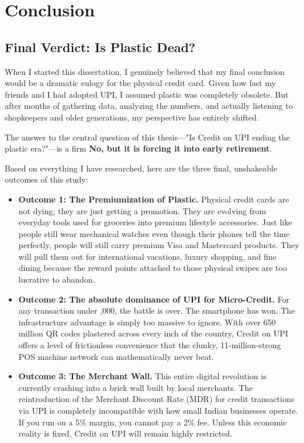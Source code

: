 \chapter{Conclusion}

\section{Final Verdict: Is Plastic Dead?}

When I started this dissertation, I genuinely believed that my final conclusion would be a dramatic eulogy for the physical credit card. Given how fast my friends and I had adopted UPI, I assumed plastic was completely obsolete. But after months of gathering data, analyzing the numbers, and actually listening to shopkeepers and older generations, my perspective has entirely shifted.

The answer to the central question of this thesis---"Is Credit on UPI ending the plastic era?"---is a firm \textbf{No, but it is forcing it into early retirement}.

Based on everything I have researched, here are the three final, unshakeable outcomes of this study:

\begin{itemize}
    \item \textbf{Outcome 1: The Premiumization of Plastic.} Physical credit cards are not dying; they are just getting a promotion. They are evolving from everyday tools used for groceries into premium lifestyle accessories. Just like people still wear mechanical watches even though their phones tell the time perfectly, people will still carry premium Visa and Mastercard products. They will pull them out for international vacations, luxury shopping, and fine dining because the reward points attached to those physical swipes are too lucrative to abandon.
    \item \textbf{Outcome 2: The absolute dominance of UPI for Micro-Credit.} For any transaction under ,000, the battle is over. The smartphone has won. The infrastructure advantage is simply too massive to ignore. With over 650 million QR codes plastered across every inch of the country, Credit on UPI offers a level of frictionless convenience that the clunky, 11-million-strong POS machine network can mathematically never beat.
    \item \textbf{Outcome 3: The Merchant Wall.} This entire digital revolution is currently crashing into a brick wall built by local merchants. The reintroduction of the Merchant Discount Rate (MDR) for credit transactions via UPI is completely incompatible with how small Indian businesses operate. If you run on a 5\% margin, you cannot pay a 2\% fee. Unless this economic reality is fixed, Credit on UPI will remain highly restricted.
\end{itemize}

